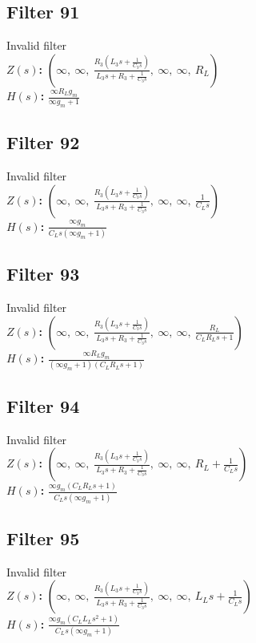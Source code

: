 \documentclass{article}
\begin{document}
\subsection*{Filter 91}
Invalid filter \\ 
\textbf{$Z(s)$:} $\left( \infty, \  \infty, \  \frac{R_{3} \left(L_{3} s + \frac{1}{C_{3} s}\right)}{L_{3} s + R_{3} + \frac{1}{C_{3} s}}, \  \infty, \  \infty, \  R_{L}\right)$ \\ 
\textbf{$H(s)$:} $\frac{\infty R_{L} g_{m}}{\infty g_{m} + 1}$ \\ 
\subsection*{Filter 92}
Invalid filter \\ 
\textbf{$Z(s)$:} $\left( \infty, \  \infty, \  \frac{R_{3} \left(L_{3} s + \frac{1}{C_{3} s}\right)}{L_{3} s + R_{3} + \frac{1}{C_{3} s}}, \  \infty, \  \infty, \  \frac{1}{C_{L} s}\right)$ \\ 
\textbf{$H(s)$:} $\frac{\infty g_{m}}{C_{L} s \left(\infty g_{m} + 1\right)}$ \\ 
\subsection*{Filter 93}
Invalid filter \\ 
\textbf{$Z(s)$:} $\left( \infty, \  \infty, \  \frac{R_{3} \left(L_{3} s + \frac{1}{C_{3} s}\right)}{L_{3} s + R_{3} + \frac{1}{C_{3} s}}, \  \infty, \  \infty, \  \frac{R_{L}}{C_{L} R_{L} s + 1}\right)$ \\ 
\textbf{$H(s)$:} $\frac{\infty R_{L} g_{m}}{\left(\infty g_{m} + 1\right) \left(C_{L} R_{L} s + 1\right)}$ \\ 
\subsection*{Filter 94}
Invalid filter \\ 
\textbf{$Z(s)$:} $\left( \infty, \  \infty, \  \frac{R_{3} \left(L_{3} s + \frac{1}{C_{3} s}\right)}{L_{3} s + R_{3} + \frac{1}{C_{3} s}}, \  \infty, \  \infty, \  R_{L} + \frac{1}{C_{L} s}\right)$ \\ 
\textbf{$H(s)$:} $\frac{\infty g_{m} \left(C_{L} R_{L} s + 1\right)}{C_{L} s \left(\infty g_{m} + 1\right)}$ \\ 
\subsection*{Filter 95}
Invalid filter \\ 
\textbf{$Z(s)$:} $\left( \infty, \  \infty, \  \frac{R_{3} \left(L_{3} s + \frac{1}{C_{3} s}\right)}{L_{3} s + R_{3} + \frac{1}{C_{3} s}}, \  \infty, \  \infty, \  L_{L} s + \frac{1}{C_{L} s}\right)$ \\ 
\textbf{$H(s)$:} $\frac{\infty g_{m} \left(C_{L} L_{L} s^{2} + 1\right)}{C_{L} s \left(\infty g_{m} + 1\right)}$ \\ 
\end{document}
